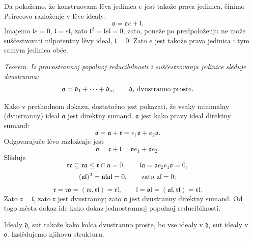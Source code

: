 \documentclass[11pt]{article}
\providecommand{\ma}{\mathfrak{a}}
\providecommand{\mc}{\mathfrak{c}}
\providecommand{\md}{\mathfrak{d}}
\providecommand{\ml}{\mathfrak{l}}
\providecommand{\mo}{\mathfrak{o}}
\providecommand{\mr}{\mathfrak{r}}
\begin{document}
Da pokažemo, že konstruovana lěva jedinica $e$ jest takože prava jedinica, činimo Peirceovo razloženje v lěve idealy:
\[
        \mo=\mo e+\ml.
\]
Imajemo $\ml e=0$, $\ml=e\ml$, zato $\ml^2=\ml e\ml=0$, zato, poneže po predpoloženju ne može suščestvovati nilpotentny lěvy ideal, $\ml=0$. Zato $e$ jest takože prava jedinica i tym samym jedinica obće.

\emph{Teorem. Iz pravostrannoj popolnoj reducibilnosti i suščestvovanja jedinice slěduje dvustranna:}
\[
        \mo=\md_1+\cdots+\md_s,
        \qquad \md_i \hbox{ dvustranno proste.}
\]

Kako v prethodnom dokazu, dostatočno jest pokazati, že vsaky minimalny (dvustranny) ideal $\ma$ jest direktny sumand. $\ma$ jest kako pravy ideal direktny sumand:
\[
        \mo=\ma+\mr=e_1\mo+e_2\mo.
\]
Odgovarajuče lěvo razloženje jest
\[
        \mo=\mc+\ml=\mo e_1+\mo e_2.
\]
Slěduje
\[
        \mr\mc\subseteq \mr\ma\leq \mr\cap\ma=0,
        \qquad
        \ml\ma=\mo e_2e_1\mo=0,
\]
\[
        (\ma\ml)^2=\ma\ml\ma\ml=0,
        \qquad \hbox{zato } \ma\ml=0;
\]
\[
        \mr=\mr\mo=(\mr\mc,\mr\ml)=\mr\ml,
        \qquad
        \ml=\mo\ml=(\ma\ml,\mr\ml)=\mr\ml.
\]
Zato $\mr=\ml$, zato $\mr$ jest dvustranny; zato $\ma$ jest dvustranny direktny sumand. Od togo města dokaz ide kako dokaz jednostrannoj popolnoj reducibilnosti.

Idealy $\md_i$ sut takože kako kolca dvustranno proste, bo vse idealy v $\md_i$ sut idealy v $\mo$. Izslědujemo njihovu strukturu.
\end{document}

